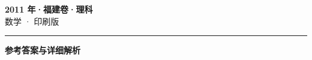 \documentclass[zihao=5, a4paper]{ctexart}
\begin{document}
\begin{center}
  {\Large\bfseries 2011 年·福建卷·理科}\\[4pt]
  {\large 数学 · 印刷版}
\end{center}
\medskip
{}

\par\bigskip\hrule\bigskip
{}
\begin{center}{\large\bfseries 参考答案与详细解析}\end{center}
\smallskip

\end{document}
